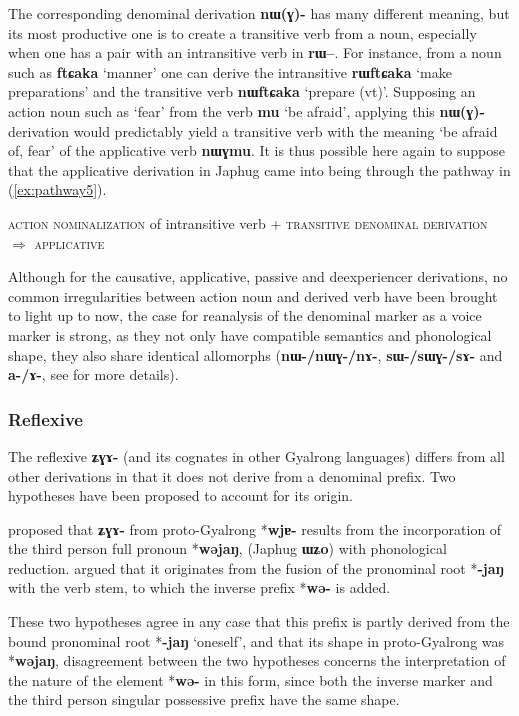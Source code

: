 \documentclass[oldfontcommands,oneside,a4paper,11pt]{article}
\newcommand{\ipa}[1]{\mbox{\phon\textbf{#1}}} %
\begin{document}
The corresponding denominal derivation \ipa{nɯ(ɣ)-} has many different meaning, but its most productive one is to create a transitive verb from a noun, especially when one has a pair with an intransitive verb in \ipa{rɯ--}. For instance, from a noun such as \ipa{ftɕaka} `manner' one can derive the intransitive \ipa{rɯftɕaka} `make preparations' and the transitive verb \ipa{nɯftɕaka} `prepare (vt)'. Supposing an action noun such as `fear' from the verb \ipa{mu}  `be afraid', applying this \ipa{nɯ(ɣ)-} derivation would predictably yield a transitive verb with the meaning `be afraid of, fear' of the applicative verb \ipa{nɯɣmu}. It is thus possible here again to suppose that the applicative derivation in Japhug came into being through the pathway in (\ref{ex:pathway5}).

\begin{exe}
\ex \label{ex:pathway5}
\glt \textsc{action nominalization} of intransitive verb + \textsc{transitive denominal derivation} $\Rightarrow$ \textsc{applicative}
\end{exe}

Although for the causative, applicative, passive and deexperiencer derivations, no common irregularities between action noun and derived verb have been brought to light up to now, the case for reanalysis of the denominal marker as a voice marker is strong, as they not only have compatible semantics and phonological shape, they also share identical allomorphs (\ipa{nɯ-/nɯɣ-/nɤ-}, \ipa{sɯ-/sɯɣ-/sɤ-} and \ipa{a-/ɤ-}, see \citealt{jacques13tropative, jacques15causative, jacques07passif} for more details). 


\subsubsection{Reflexive} \label{sec:refl}
The reflexive \ipa{ʑɣɤ-} (and its cognates in other Gyalrong languages) differs from all other derivations in that it does not derive from a denominal prefix. Two hypotheses have been proposed to account for its origin. 

\citet{jacques10refl} proposed that \ipa{ʑɣɤ-} from proto-Gyalrong *\ipa{wjɐ-} results from the incorporation of the third person full pronoun *\ipa{wəjaŋ}, (Japhug \ipa{ɯʑo}) with phonological reduction. \citet{jackson14morpho} argued that it originates from the fusion of the pronominal root *\ipa{-jaŋ} with the verb stem, to which the inverse prefix *\ipa{wə-} is added.

These two hypotheses agree in any case that this prefix is partly derived from the bound pronominal root *\ipa{-jaŋ} `oneself', and that its shape in proto-Gyalrong was *\ipa{wəjaŋ}, disagreement between the two hypotheses concerns the interpretation of the nature of the element *\ipa{wə-} in this form, since both the inverse marker and the third person singular possessive prefix have the same shape.
\end{document}
